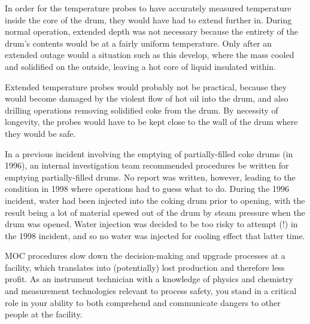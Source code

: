 In order for the temperature probes to have accurately measured temperature inside the core of the drum, they would have had to extend further in.  During normal operation, extended depth was not necessary because the entirety of the drum's contents would be at a fairly uniform temperature.  Only after an extended outage would a situation such as this develop, where the mass cooled and solidified on the outside, leaving a hot core of liquid insulated within.  

Extended temperature probes would probably not be practical, because they would become damaged by the violent flow of hot oil into the drum, and also drilling operations removing solidified coke from the drum.  By necessity of longevity, the probes would have to be kept close to the wall of the drum where they would be safe.

\vskip 10pt

In a previous incident involving the emptying of partially-filled coke drums (in 1996), an internal investigation team recommended procedures be written for emptying partially-filled drums.  No report was written, however, leading to the condition in 1998 where operations had to guess what to do.  During the 1996 incident, water had been injected into the coking drum prior to opening, with the result being a lot of material spewed out of the drum by steam pressure when the drum was opened.  Water injection was decided to be too risky to attempt (!) in the 1998 incident, and so no water was injected for cooling effect that latter time.

\vskip 10pt

MOC procedures slow down the decision-making and upgrade processes at a facility, which translates into (potentially) lost production and therefore less profit.  As an instrument technician with a knowledge of physics and chemistry and measurement technologies relevant to process safety, you stand in a critical role in your ability to both comprehend and communicate dangers to other people at the facility.




